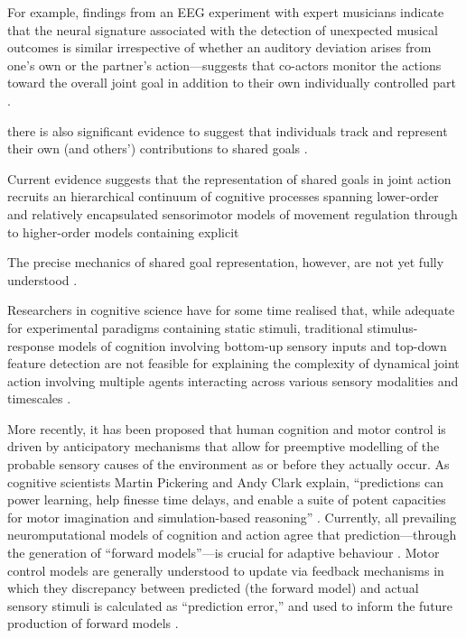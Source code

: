 \begin{CJK}{UTF8}{gbsn}
For example, findings from an EEG experiment with expert musicians indicate that the neural signature associated with the detection of unexpected musical outcomes is similar irrespective of whether an auditory deviation arises from one’s own or the partner’s action---suggests that co-actors monitor the actions toward the overall joint goal in addition to their own individually controlled part \citep{Loehr2013}.


there is also significant evidence to suggest that individuals track and represent their own (and others') contributions to shared goals \citep{Keller2016,Pesquita2017}.


Current evidence suggests that the representation of shared goals in joint action recruits an hierarchical continuum of cognitive processes spanning lower-order and relatively encapsulated sensorimotor models of movement regulation through to higher-order models containing explicit

The precise mechanics of shared goal representation, however, are not yet fully understood \citep{Pickering2014}.

Researchers in cognitive science have for some time realised that, while adequate for experimental paradigms containing static stimuli, traditional stimulus-response models of cognition involving bottom-up sensory inputs and top-down feature detection \citep[see][]{Marr1985} are not feasible for explaining the complexity of dynamical joint action involving multiple agents interacting across various sensory modalities and timescales \citep{Wolpert2003}.


More recently, it has been proposed that human cognition and motor control is driven by anticipatory mechanisms that allow for preemptive modelling of the probable sensory causes of the environment as or before they actually occur.  As cognitive scientists Martin Pickering and Andy Clark explain, ``predictions can power learning, help finesse time delays, and enable a suite of potent capacities for motor imagination and simulation-based reasoning'' \citep[6]{Pickering2014}.  Currently, all prevailing neuromputational models of cognition and action agree that prediction---through the generation of ``forward models''---is crucial for adaptive behaviour \citep{Wolpert2003,Clark2013}.  Motor control models are generally understood to update via feedback mechanisms in which they discrepancy between predicted (the forward model) and actual sensory stimuli is calculated as ``prediction error,'' and used to inform the future production of forward models \citep{Wolpert1995}.




\end{CJK}
